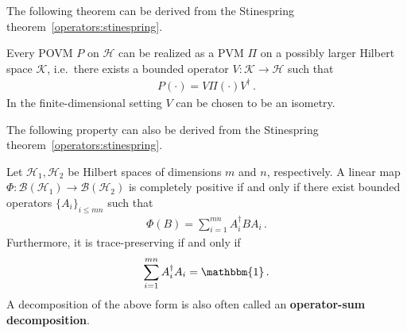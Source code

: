     The following theorem can be derived from the Stinespring theorem~\ref{operators:stinespring}.
    \begin{theorem}
        Every POVM $P$ on $\mathcal{H}$ can be realized as a PVM $\Pi$ on a possibly larger Hilbert space $\mathcal{K}$, i.e.~there exists a bounded operator $V:\mathcal{K}\rightarrow\mathcal{H}$ such that
        \begin{gather}
            P(\cdot) = V\Pi(\cdot)V^\dagger\,.
        \end{gather}
        In the finite-dimensional setting $V$ can be chosen to be an isometry.
    \end{theorem}


    The following property can also be derived from the Stinespring theorem~\ref{operators:stinespring}.
    \begin{property}\label{qc:kraus}
        Let $\mathcal{H}_1,\mathcal{H}_2$ be Hilbert spaces of dimensions $m$ and $n$, respectively. A linear map $\Phi:\mathcal{B}(\mathcal{H}_1)\rightarrow\mathcal{B}(\mathcal{H}_2)$ is completely positive if and only if there exist bounded operators $\{A_i\}_{i\leq mn}$ such that
        \begin{gather}
            \Phi(B) = \sum_{i=1}^{mn}A^\dag_iBA_i\,.
        \end{gather}
        Furthermore, it is trace-preserving if and only if
        \begin{gather}
            \sum_{i=1}^{mn}A^\dag_iA_i = \mathbbm{1}\,.
        \end{gather}
        A decomposition of the above form is also often called an \textbf{operator-sum decomposition}.
    \end{property}